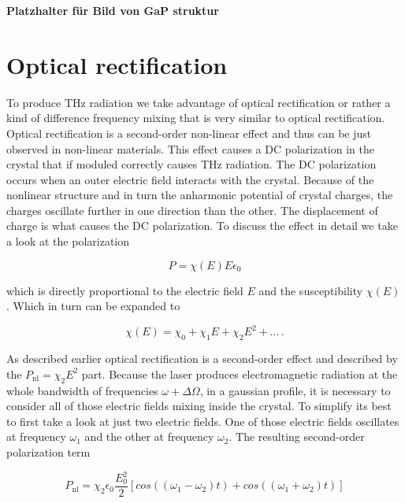 \textbf{Platzhalter für Bild von GaP struktur}


\section{Optical rectification}\label{sec:optic_ref}
To produce $\si{\tera\hertz}$ radiation we take advantage of optical rectification or rather a kind of difference frequency mixing that is very similar to optical rectification.
Optical rectification is a second-order non-linear effect and thus can be just observed in non-linear materials.
This effect causes a DC polarization in the crystal that if moduled correctly causes $\si{\tera\hertz}$ radiation.
The DC polarization occurs when an outer electric field interacts with the crystal.
Because of the nonlinear structure and in turn the anharmonic potential of crystal charges, the charges oscillate further in one direction than the other.
The displacement of charge is what causes the DC polarization.
To discuss the effect in detail we take a look at the polarization

\begin{equation}
P = \chi(E) E \epsilon_0
\end{equation}

which is directly proportional to the electric field $E$ and the susceptibility $\chi(E)$.
Which in turn can be expanded to 

\begin{equation}
    \chi(E) = \chi_0 + \chi_1 E +\chi_2 E^2 + ...   \, .
\end{equation}

As described earlier optical rectification is a second-order effect and described by the $P_\text{nl} = \chi_2 E^2$ part.
Because the laser produces electromagnetic radiation at the whole bandwidth of frequencies $\omega + \Delta\Omega$, in a gaussian profile, it is necessary to consider all of those electric fields mixing inside the crystal.
To simplify its best to first take a look at just two electric fields.
One of those electric fields oscillates at frequency $\omega_1$ and the other at frequency $\omega_2$.
The resulting second-order polarization term 

\begin{equation}
    P_\text{nl} = \chi_2 \epsilon_0 \frac{E_0^2}{2}\left[cos((\omega_1 - \omega_2)t) + cos((\omega_1 + \omega_2)t)\right]
\label{eq:two_freq_mixing}
\end{equation}

